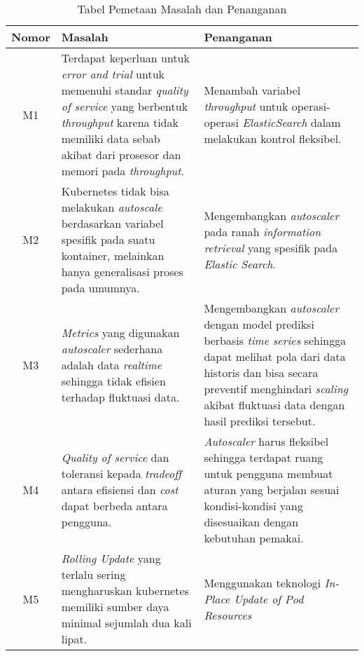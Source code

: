 \begin{table}[h]
    \caption{Tabel Pemetaan Masalah dan Penanganan}
    \vspace{0.25cm}
    \begin{center}
        \begin{tabular}{|c|p{2.5in}|p{2.5in}|}
            \rowcolor{gray!30}
            \hline
            \textbf{Nomor} & \textbf{Masalah} & \textbf{Penanganan} \tabularnewline
            \hline
            M1 & Terdapat keperluan untuk \textit{error and trial} untuk memenuhi standar \textit{quality of service} yang berbentuk \textit{throughput} karena tidak memiliki data sebab akibat dari prosesor dan memori pada \textit{throughput}. &
            Menambah variabel \textit{throughput} untuk operasi-operasi \textit{ElasticSearch} dalam melakukan kontrol fleksibel.
            \tabularnewline

            M2 &
            Kubernetes tidak bisa melakukan \textit{autoscale} berdasarkan variabel spesifik pada suatu kontainer, melainkan hanya generalisasi proses pada umumnya. &
            Mengembangkan \textit{autoscaler} pada ranah \textit{information retrieval} yang spesifik pada \textit{Elastic Search}. \tabularnewline

            M3 &
            \textit{Metrics} yang digunakan \textit{autoscaler} sederhana adalah data \textit{realtime} sehingga tidak efisien terhadap fluktuasi data. &
            Mengembangkan \textit{autoscaler} dengan model prediksi berbasis \textit{time series} sehingga dapat melihat pola dari data historis dan bisa secara preventif menghindari \textit{scaling} akibat fluktuasi data dengan hasil prediksi tersebut.\tabularnewline

            M4 & \textit{Quality of service} dan toleransi kepada \textit{tradeoff} antara efisiensi dan \textit{cost} dapat berbeda antara pengguna. &
            \textit{Autoscaler} harus fleksibel sehingga terdapat ruang untuk pengguna membuat aturan yang berjalan sesuai kondisi-kondisi yang disesuaikan dengan kebutuhan pemakai.\tabularnewline

            M5 & \textit{Rolling Update} yang terlalu sering mengharuskan kubernetes memiliki sumber daya minimal sejumlah dua kali lipat. &
            Menggunakan teknologi \textit{In-Place Update of Pod Resources} \tabularnewline
            \hline
        \end{tabular}
    \end{center}
    \label{tab:pemetaan-masalah}
\end{table}